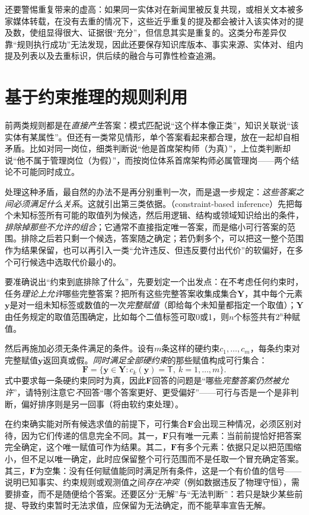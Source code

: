 还要警惕重复带来的虚高：如果同一实体对在新闻里被反复共现，或相关文本被多家媒体转载，在没有去重的情况下，这些近乎重复的提及都会被计入该实体对的提及数，使组显得很大、证据很“充分”，但信息其实是重复的。这类分布差异仅靠“规则执行成功”无法发现，因此还要保存知识库版本、事实来源、实体对、组内提及列表以及去重标识，供后续的融合与可靠性检查追溯。

\section{基于约束推理的规则利用}
\label{sec:rule-based-knowledge-acquisition-constraint}

前两类规则都是在\emph{直接产生}答案：模式匹配说“这个样本像正类”，知识关联说“该实体有某属性”。但还有一类常见情形，单个答案看起来都合理，放在一起却自相矛盾。比如对同一岗位，细类判断说“他是首席架构师（为真）”，上位类判断却说“他不属于管理岗位（为假）”，而按岗位体系首席架构师必属管理岗——两个结论不可能同时成立。

处理这种矛盾，最自然的办法不是再分别重判一次，而是退一步规定：\emph{这些答案之间必须满足什么关系}。这就引出第三类依据。（constraint-based inference）先把每个未知标签所有可能的取值列为候选，然后用逻辑、结构或领域知识给出的条件，\emph{排除掉那些不允许的组合}；它通常不直接指定唯一答案，而是缩小可行答案的范围。排除之后若只剩一个候选，答案随之确定；若仍剩多个，可以把这一整个范围作为结果保留，也可以再引入一类“允许违反、但违反要付出代价”的软偏好，在多个可行候选中选取代价最小的。

要准确说出“约束到底排除了什么”，先要划定一个出发点：在不考虑任何约束时，任务\emph{理论上允许}哪些完整答案？把所有这些完整答案收集成集合$\bm{Y}$，其中每个元素$\bm{y}$是对一组未知标签或数值的一次\emph{完整赋值}（即给每个未知量都指定一个取值）；$\bm{Y}$由任务规定的取值范围确定，比如每个二值标签可取0或1，则$n$个标签共有$2^n$种赋值。

然后再施加必须无条件满足的条件。设有$m$条这样的硬约束$c_1,\ldots,c_m$，每条约束对完整赋值$\bm{y}$返回真或假。\emph{同时满足全部硬约束}的那些赋值构成可行集合：
\begin{equation}
  \bm{F}
  =
  \{\bm{y}\in\bm{Y}:c_k(\bm{y})=\mathsf{T},\ k=1,\ldots,m\}.
  \label{eq:rule-based-knowledge-acquisition-feasible-set}
\end{equation}
式中要求每一条硬约束同时为真，因此$\bm{F}$回答的问题是“哪些\emph{完整答案仍然被允许}”，请特别注意它\emph{不}回答“哪个答案更好、更受偏好”——可行与否是一个是非判断，偏好排序则是另一回事（将由软约束处理）。

在约束确实能对所有候选求值的前提下，可行集合$\bm{F}$会出现三种情况，必须区别对待，因为它们传递的信息完全不同。其一，$\bm{F}$只有唯一元素：当前前提恰好把答案完全确定，这个唯一赋值可作为结果。其二，$\bm{F}$有多个元素：依据只足以把范围缩小，但不足以唯一确定，此时应保留整个可行范围而不是任取一个冒充确定答案。其三，$\bm{F}$为空集：没有任何赋值能同时满足所有条件，这是一个有价值的信号——说明已知事实、约束规则或观测值之间\emph{存在冲突}（例如数据违反了物理守恒），需要排查，而不是随便给个答案。还要区分“无解”与“无法判断”：若只是缺少某些前提、导致约束暂时无法求值，应保留为无法确定，而不能草率宣告无解。

